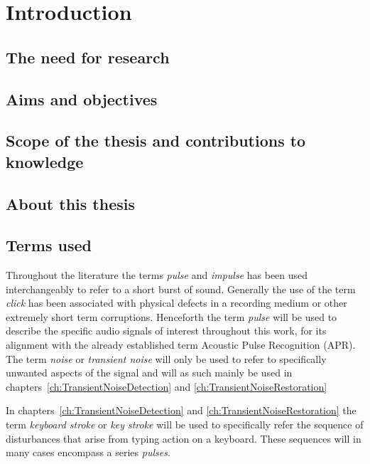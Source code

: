 \chapter{Introduction}
\ifpdf
    \graphicspath{{Introduction/IntroductionFigs/PNG/}{Introduction/IntroductionFigs/PDF/}{Introduction/IntroductionFigs/}}
\else
    \graphicspath{{Introduction/IntroductionFigs/EPS/}{Introduction/IntroductionFigs/}}
\fi

\section{The need for research}

\section{Aims and objectives}

\section{Scope of the thesis and contributions to knowledge}

\section{About this thesis}

\section{Terms used}
Throughout the literature the terms \emph{pulse}\cite{Esquef2002a}\cite{Esquef2003a} and \emph{impulse}\cite{Czyzewski1995}\cite{Kauppinen2002a}\cite{Chen2000} has been used interchangeably to refer to a short burst of sound. Generally the use of the term \emph{click}\cite{Czyzewski1995}\cite{Esquef2002}\cite{Godsill1998book} has been associated with physical defects in a recording medium or other extremely short term corruptions. Henceforth the term \emph{pulse} will be used to describe the specific audio signals of interest throughout this work, for its alignment with the already established term Acoustic Pulse Recognition (APR)\cite{TouchSystems2006}. The term \emph{noise} or \emph{transient noise} will only be used to refer to specifically unwanted aspects of the signal and will as such mainly be used in chapters~\ref{ch:TransientNoiseDetection} and \ref{ch:TransientNoiseRestoration}

In chapters~\ref{ch:TransientNoiseDetection} and \ref{ch:TransientNoiseRestoration} the term \emph{keyboard stroke} or \emph{key stroke} will be used to specifically refer the sequence of disturbances that arise from typing action on a keyboard. These sequences will in many cases encompass a series \emph{pulses}.




